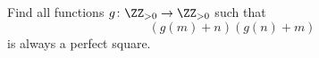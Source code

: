 Find all functions $g \colon \ZZ_{>0} \to \ZZ_{>0}$ such that
\[ \left( g(m)+n \right)\left( g(n)+m \right) \]
is always a perfect square.